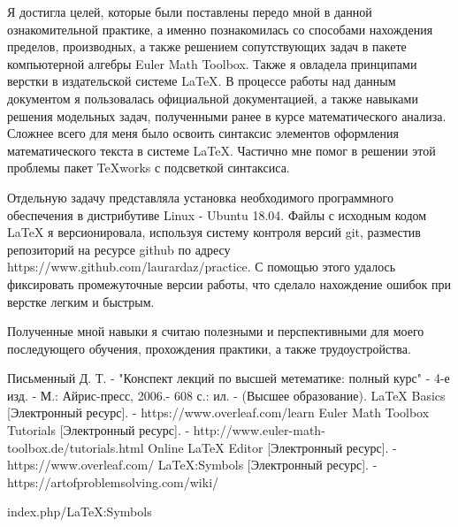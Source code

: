 \documentclass[14pt]{extreport}
\begin{document}
\conclusions

Я достигла целей, которые были поставлены передо мной в данной ознакомительной практике, а именно познакомилась со способами нахождения пределов, производных, а также решением сопутствующих задач в пакете компьютерной алгебры Euler Math Toolbox. Также я овладела принципами верстки в издательской системе LaTeX.  В процессе работы над данным документом я пользовалась официальной документацией, а также навыками решения модельных задач, полученными ранее в курсе математического  анализа. Сложнее всего для меня было освоить синтаксис элементов оформления математического текста в системе LaTeX. Частично мне помог в решении этой проблемы пакет TeXworks с подсветкой синтаксиса.  

Отдельную задачу представляла установка необходимого программного обеспечения в дистрибутиве Linux - Ubuntu 18.04. Файлы с исходным кодом LaTeX я версионировала, используя систему контроля версий git, разместив репозиторий на ресурсе github по адресу https://www.github.com/laurardaz/practice. С помощью этого удалось фиксировать промежуточные версии работы, что сделало нахождение ошибок при верстке легким и быстрым. 

Полученные мной навыки я считаю полезными и перспективными для моего последующего обучения, прохождения практики, а также трудоустройства.  

\newpage
 

 
\begin{thebibliography}{}
      Письменный Д. Т.  -  "Конспект лекций по высшей метематике: полный курс" - 4-е изд. - М.: Айрис-пресс, 2006.- 608 с.: ил. - (Высшее образование).
      LaTeX Basics [Электронный ресурс]. - https://www.overleaf.com/learn
     Euler Math Toolbox Tutorials [Электронный ресурс]. -  http://www.euler-math-toolbox.de/tutorials.html
    Online LaTeX Editor [Электронный ресурс]. - https://www.overleaf.com/
    LaTeX:Symbols [Электронный ресурс]. - https://artofproblemsolving.com/wiki/

index.php/LaTeX:Symbols

\end{thebibliography}
\end{document}
